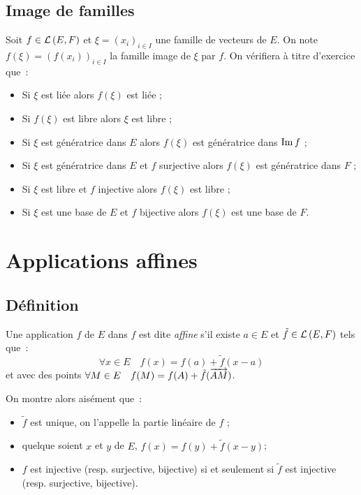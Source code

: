 \subsection{Image de familles}
\label{subsec-chap0:Image}
Soit $f \in \mathcal{L}\left(E,F\right)$ et $\xi=(x_i)_{i \in I}$ une famille de vecteurs de $E$.
On note $f(\xi) = (f(x_i))_{i \in I}$ la famille image de $\xi$ par $f$. On
vérifiera à titre d'exercice que~:
\begin{itemize}
    \item Si $\xi$ est liée alors $f(\xi)$ est liée ;
    \item Si $f(\xi)$ est libre alors $\xi$ est libre ;
    \item Si $\xi$ est génératrice dans $E$ alors $f(\xi)$ est génératrice dans
        $\operatorname{Im}{f}$ ;
    \item Si $\xi$ est génératrice dans $E$ et $f$ surjective alors $f(\xi)$ est
        génératrice dans $F$ ;
    \item Si $\xi$ est libre et $f$ injective alors $f(\xi)$ est libre ;
    \item Si $\xi$ est une base de $E$ et $f$ bijective alors $f(\xi)$ est une base de $F$.
\end{itemize}
\section{Applications affines}
\label{sec-chap0:Appaff}
\subsection{Définition}
\label{subsec-chap0:Def2}
\begin{defdef}
    Une application $f$ de $E$ dans $f$ est dite \emph{affine} s'il existe $a
    \in E$ et $\tilde{f} \in \mathcal{L}\left(E,F\right)$ tels que~:
    \begin{equation}
        \forall x \in E \quad f(x)=f(a)+\tilde{f}(x-a)
    \end{equation}
    et avec des points $\forall M \in E \quad f(M)=f(A)+ \tilde{f}(\overrightarrow{AM})$.
\end{defdef}
On montre alors aisément que~:
\begin{itemize}
    \item $\tilde{f}$ est unique, on l'appelle la partie linéaire de $f$ ;
    \item quelque soient $x$ et $y$ de $E$, $f(x)=f(y)+\tilde{f}(x-y)$;
    \item $f$ est injective (resp. surjective, bijective) si et seulement si
        $\tilde{f}$ est injective (resp. surjective, bijective).
\end{itemize}
